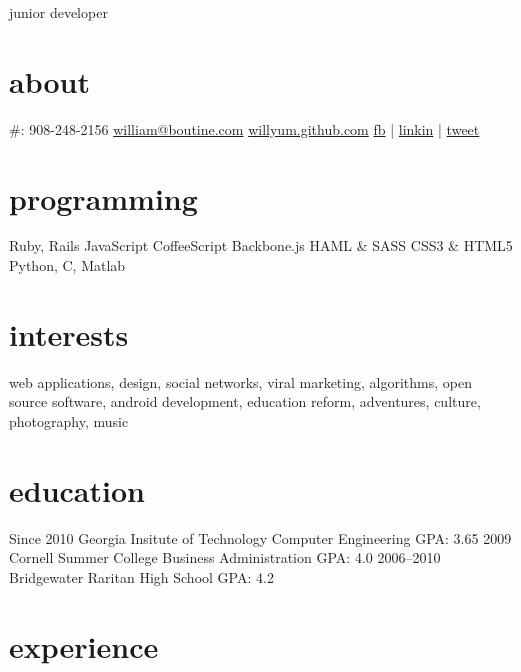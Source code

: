 \documentclass[]{cv}
\begin{document}
       {junior developer}

\begin{aside}
  \section{about}
     \#: 908-248-2156
    \href{mailto:william@boutine.com}{william@boutine.com}
    \href{http://willyum.github.com}{willyum.github.com}
    \href{http://facebook.com/kingwillah}{fb} | \href{http://www.linkedin.com/profile/view?id=158614185}{linkin} | \href{https://twitter.com/#!/wking124}{tweet}
  \section{programming}
    Ruby, Rails
    JavaScript
    CoffeeScript
    Backbone.js
    HAML \& SASS
    CSS3 \& HTML5
    Python, C, Matlab
\end{aside}

\section{interests}

web applications, design, social networks, viral marketing, algorithms, open source software, android development, education reform, adventures, culture, photography, music

\section{education}

\begin{entrylist}
  \entry
    {Since 2010}
    {Georgia Insitute of Technology}
    {Computer Engineering}
    {GPA: 3.65\newline}
  \entry
    {2009}
    {Cornell Summer College}
    {Business Administration}
    {GPA: 4.0\newline}
  \entry
    {2006–2010}
    {Bridgewater Raritan High School}
    {}
    {GPA: 4.2\newline}
\end{entrylist}

\section{experience}
\end{document}
